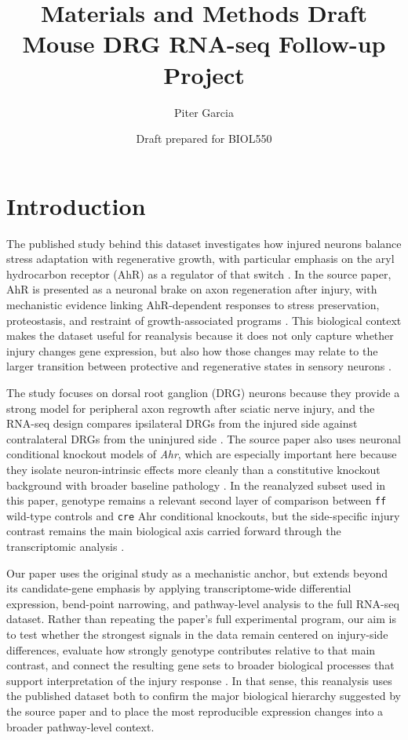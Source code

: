 \documentclass[12pt]{article}
\title{Materials and Methods Draft\\Mouse DRG RNA-seq Follow-up Project}
\author{Piter Garcia}
\date{Draft prepared for BIOL550}
\DeclareRobustCommand{\artifact}[1]{\texttt{#1}}
\begin{document}
\maketitle

\section{Introduction}

The published study behind this dataset investigates how injured neurons balance stress adaptation with regenerative growth, with particular emphasis on the aryl hydrocarbon receptor (AhR) as a regulator of that switch \parencite{halawani2023ahr}. In the source paper, AhR is presented as a neuronal brake on axon regeneration after injury, with mechanistic evidence linking AhR-dependent responses to stress preservation, proteostasis, and restraint of growth-associated programs \parencite{halawani2023ahr}. This biological context makes the dataset useful for reanalysis because it does not only capture whether injury changes gene expression, but also how those changes may relate to the larger transition between protective and regenerative states in sensory neurons \parencite{halawani2023ahr}.

The study focuses on dorsal root ganglion (DRG) neurons because they provide a strong model for peripheral axon regrowth after sciatic nerve injury, and the RNA-seq design compares ipsilateral DRGs from the injured side against contralateral DRGs from the uninjured side \parencite{halawani2023ahr}. The source paper also uses neuronal conditional knockout models of \textit{Ahr}, which are especially important here because they isolate neuron-intrinsic effects more cleanly than a constitutive knockout background with broader baseline pathology \parencite{halawani2023ahr}. In the reanalyzed subset used in this paper, genotype remains a relevant second layer of comparison between \artifact{ff} wild-type controls and \artifact{cre} Ahr conditional knockouts, but the side-specific injury contrast remains the main biological axis carried forward through the transcriptomic analysis \parencite{halawani2023ahr,sraStudySRP618841,bioprojectPRJNA1322439,geoGSE243308}.

Our paper uses the original study as a mechanistic anchor, but extends beyond its candidate-gene emphasis by applying transcriptome-wide differential expression, bend-point narrowing, and pathway-level analysis to the full RNA-seq dataset. Rather than repeating the paper's full experimental program, our aim is to test whether the strongest signals in the data remain centered on injury-side differences, evaluate how strongly genotype contributes relative to that main contrast, and connect the resulting gene sets to broader biological processes that support interpretation of the injury response \parencite{halawani2023ahr}. In that sense, this reanalysis uses the published dataset both to confirm the major biological hierarchy suggested by the source paper and to place the most reproducible expression changes into a broader pathway-level context.
\end{document}
